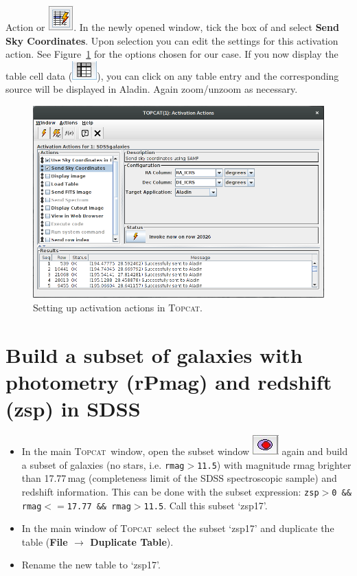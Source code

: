 \documentclass [a4paper, 12pt]{article}
\newcommand{\aladin}{{\textsc{A}{ladin}}}
\newcommand{\topcat}{{\textsc{Topcat}}}
\begin{document}
\begin{itemize}
\begin{itemize}
{    Action} or \includegraphics[width=0.035  
    \textwidth]{../images/topcat_button_activationaction.png}. In the newly 
    opened window, tick the box of and select \textbf{Send Sky Coordinates}. 
    Upon selection you can edit the settings for this activation action. See 
    Figure~\ref{fig:topcat_activation} for the options chosen for our case. If 
    you now display the table cell data (\includegraphics[width=0.035  
    \textwidth]{../images/topcat_button_open-tab.jpg}), you can click on any 
    table entry 
    and the corresponding source will be displayed in \aladin. Again 
    zoom/unzoom as necessary. 
\end{itemize}
\end{itemize}

\begin{figure}[H]
     \center
     \includegraphics[width=0.6 
     \textwidth]{../images/topcat_window_activationaction.png}
     \caption{Setting up activation actions in \topcat.}
     \label{fig:topcat_activation}
\end{figure}

\section{Build a subset of galaxies with photometry (rPmag) and redshift (zsp) in SDSS}

\begin{itemize}
\item In the main \topcat\ window, open the subset window  
\includegraphics[width=0.04  \textwidth]{../images/topcat_button_subset.jpg} 
again and 
build a subset of galaxies (no stars, i.e. \texttt{rmag$>$11.5}) with magnitude 
rmag brighter than 17.77\,mag (completeness limit of the SDSS spectroscopic 
sample) and redshift information. This can be done with the subset expression: 
\texttt{zsp$>$0 \&\& rmag$<=$17.77 \&\& rmag$>$11.5}. Call this subset `zsp17'.
\item In the main window of \topcat\ select the subset `zsp17' and duplicate the table (\textbf{File $\rightarrow$ Duplicate Table}).
\item Rename the new table to `zsp17'. 
\end{itemize}
\end{document}
